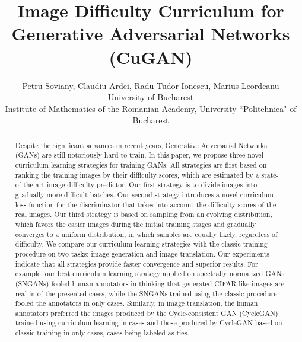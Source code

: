 \documentclass[10pt,twocolumn,letterpaper]{article}
\begin{document}
\title{Image Difficulty Curriculum for Generative Adversarial Networks (CuGAN)\vspace{-0.4cm}}

\author{Petru Soviany, Claudiu Ardei, Radu Tudor Ionescu, Marius Leordeanu\\
University of Bucharest\\
Institute of Mathematics of the Romanian Academy, University ``Politehnica" of Bucharest\\
\vspace{-0.8cm}
}

\maketitle



\begin{abstract}
\vspace{-0.3cm}
Despite the significant advances in recent years, Generative Adversarial Networks (GANs) are still notoriously hard to train. In this paper, we propose three novel curriculum learning strategies for training GANs. All strategies are first based on ranking the training images by their difficulty scores, which are estimated by a state-of-the-art image difficulty predictor. Our first strategy is to divide images into gradually more difficult batches. Our second strategy introduces a novel curriculum loss function for the discriminator that takes into account the difficulty scores of the real images. Our third strategy is based on sampling from an evolving distribution, which favors the easier images during the initial training stages and gradually converges to a uniform distribution, in which samples are equally likely, regardless of difficulty.
We compare our curriculum learning strategies with the classic training procedure on two tasks: image generation and image translation. Our experiments indicate that all strategies provide faster convergence and superior results. For example, our best curriculum learning strategy applied on spectrally normalized GANs (SNGANs) fooled human annotators in thinking that generated CIFAR-like images are real in  of the presented cases, while the SNGANs trained using the classic procedure fooled the annotators in only  cases. Similarly, in image translation, the human annotators preferred the images produced by the Cycle-consistent GAN (CycleGAN) trained using curriculum learning in  cases and those produced by CycleGAN based on classic training in only  cases,  cases being labeled as ties.
\vspace{-0.4cm}
\end{abstract}
\end{document}

